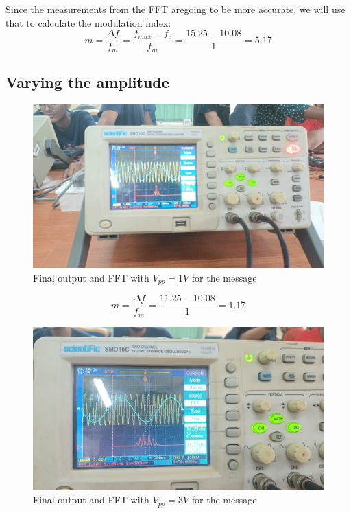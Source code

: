 \documentclass{article}
\begin{document}
Since the measurements from the FFT aregoing to be more accurate, we will use that to calculate the modulation index:
\begin{equation}
  m=\frac{\Delta f}{f_m}=\frac{f_{max}-f_c}{f_m}=\frac{15.25-10.08}{1}=5.17
\end{equation}
\clearpage
\subsection{Varying the amplitude}
\begin{figure}[!ht]
\includegraphics[width=\textwidth]{V_pp_m_1V.jpeg}
\caption{Final output and FFT with $V_{pp}=1V$ for the message}
\label{fig:V_pp_m_1V}
\end{figure}
\begin{equation}
    m=\frac{\Delta f}{f_m}=\frac{11.25-10.08}{1}=1.17
\end{equation}
\begin{figure}[!ht]
\includegraphics[width=\textwidth]{V_pp_m_3V.jpeg}
\caption{Final output and FFT with $V_{pp}=3V$ for the message}
\label{fig:V_pp_m_3V}
\end{figure}
\end{document}
